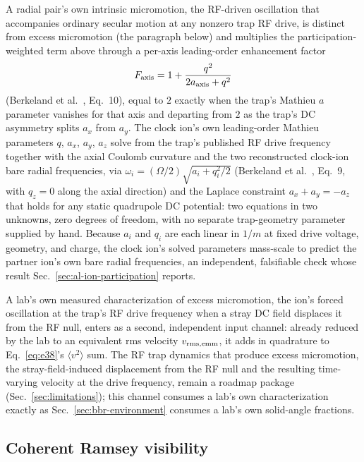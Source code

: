 \documentclass[aps,pra,superscriptaddress,groupedaddress,nofootinbib]{revtex4-2}
\begin{document}
A radial pair's own intrinsic micromotion, the RF-driven oscillation that
accompanies ordinary secular motion at any nonzero trap RF drive, is
distinct from excess micromotion (the paragraph below) and multiplies the
participation-weighted term above through a per-axis leading-order
enhancement factor
\begin{equation*}
  F_{\rm axis} = 1 + \frac{q^2}{2a_{\rm axis}+q^2}
\end{equation*}
(Berkeland et al.~\cite{Berkeland1998}, Eq.~10), equal to $2$ exactly when the trap's
Mathieu $a$ parameter vanishes for that axis and departing from $2$ as the
trap's DC asymmetry splits $a_x$ from $a_y$. The clock ion's own
leading-order Mathieu parameters $q$, $a_x$, $a_y$, $a_z$ solve from the
trap's published RF drive frequency together with the axial Coulomb
curvature and the two reconstructed clock-ion bare radial frequencies, via
$\omega_i=(\Omega/2)\sqrt{a_i+q_i^2/2}$ (Berkeland et al.~\cite{Berkeland1998},
Eq.~9, with $q_z=0$ along the axial direction) and the Laplace constraint
$a_x+a_y=-a_z$ that holds for any static quadrupole DC potential: two
equations in two unknowns, zero degrees of freedom, with no separate
trap-geometry parameter supplied by hand. Because $a_i$ and $q_i$ are each
linear in $1/m$ at fixed drive voltage, geometry, and charge, the clock
ion's solved parameters mass-scale to predict the partner ion's own bare
radial frequencies, an independent, falsifiable check whose result
Sec.~\ref{sec:al-ion-participation} reports.

A lab's own measured characterization of excess micromotion, the ion's
forced oscillation at the trap's RF drive frequency when a stray DC field
displaces it from the RF null, enters as a second, independent input
channel: already reduced by the lab to an equivalent rms velocity
$v_{\rm rms,emm}$, it adds in quadrature to Eq.~\eqref{eq:e38}'s
$\langle v^2\rangle$ sum. The RF trap dynamics that produce excess
micromotion, the stray-field-induced displacement from the RF null and the
resulting time-varying velocity at the drive frequency, remain a roadmap
package (Sec.~\ref{sec:limitations}); this channel consumes a lab's own
characterization exactly as Sec.~\ref{sec:bbr-environment} consumes a lab's
own solid-angle fractions.

\subsection{Coherent Ramsey visibility}
\label{sec:coherent-visibility}
\end{document}
